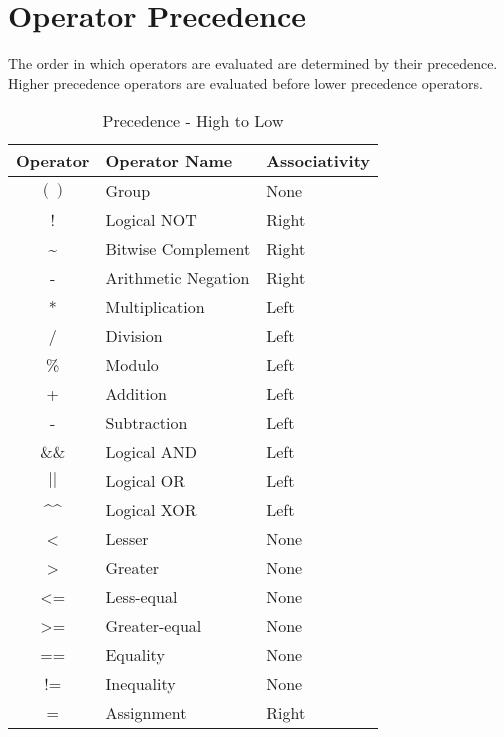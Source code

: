 \documentclass{article}
\begin{document}
\section{Operator Precedence}
The order in which operators are evaluated are determined by their precedence.
Higher precedence operators are evaluated before lower precedence operators.

\begin{table}[h!]
\begin{center}
	\caption{Precedence - High to Low}
\begin{tabular}{|c|l|l|}
	\hline
	Operator & Operator Name & Associativity \\
	\hline
	$( )$              & Group               & None  \\
	!                  & Logical NOT         & Right \\
	\~{}               & Bitwise Complement  & Right \\
	-                  & Arithmetic Negation & Right \\

	*                  & Multiplication      & Left \\
	/                  & Division            & Left \\
	\%                 & Modulo              & Left \\

	+                  & Addition            & Left \\
	-                  & Subtraction         & Left \\

	\&\&               & Logical AND         & Left \\
	$||$               & Logical OR          & Left \\
	\^{}\^{}           & Logical XOR         & Left \\

	\textless          & Lesser              & None \\
	\textgreater       & Greater             & None \\
	\textless=         & Less-equal          & None \\
	\textgreater=      & Greater-equal       & None \\

	==                 & Equality            & None \\
	!=                 & Inequality          & None \\

	=                  & Assignment          & Right \\
	\hline
\end{tabular}
\end{center}
\end{table}
\end{document}
